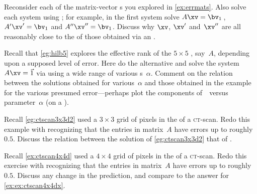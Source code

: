 \begin{exercise}  
Reconsider each of the matrix-vector s you explored in \cref{ex:errmats}.
Also solve each system using ; for example, in the first system solve \(A\xv=\bv_1\)\,, \(A'\xv'=\bv_1\) and \(A''\xv''=\bv_1\).
Discuss why \(\xv\), \(\xv'\) and~\(\xv''\) are all reasonably close to the  of those obtained via an \svd.
\end{exercise}




\begin{exercise}  
Recall that \cref{eg:hilb5} explores the effective rank of the \(5\times5\) , say~\(A\), depending upon a supposed level of error.
Here do the alternative and solve the system \(A\xv=\vec 1\) via  using a wide range of various s~\(\alpha\).
Comment on the relation between the solutions obtained for various~\(\alpha\) and those obtained in the example for the various presumed error---perhaps plot the components of~\xv\ versus parameter~\(\alpha\) (on a ).
\end{exercise}




\begin{exercise}  
Recall \cref{eg:ctscan3x3d2} used a \(3\times3\) grid of pixels in the  of a \textsc{ct}-scan.
Redo this example with  recognizing that the entries in matrix~\(A\) have errors up to roughly~\(0.5\).
Discuss the relation between the solution of \cref{eg:ctscan3x3d2} that of .
\end{exercise}




\begin{exercise}  
Recall \cref{ex:ctscan4x4d} used a \(4\times4\) grid of pixels in the  of a \textsc{ct}-scan.
Redo this exercise with  recognizing that the entries in matrix~\(A\) have errors up to roughly~\(0.5\).
Discuss any change in the prediction, and compare to the answer for \cref{ex:ex:ctscan4x4dx}.
\end{exercise}






